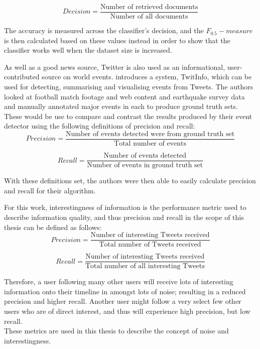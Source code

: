 \[
	Decision = \frac{\text{Number of retrieved documents}}{\text{Number of all documents}}
\]

The accuracy is measured across the classifier's decision, and the $ F_{0.5}-measure $  is then calculated based on these values instead in order to show that the classifier works well when the dataset size is increased.

As well as a good news source, Twitter is also used as an informational, user-contributed source on world events. \cite{marcus11}  introduces a system, TwitInfo, which can be used for detecting, summarising and visualising events from Tweets. The authors looked at football match footage and web content and earthquake survey data and manually annotated major events in each to produce ground truth sets. These would be use to compare and contrast the results produced by their event detector using the following definitions of precision and recall:
\[	
	Precision = \frac{\text{Number of events detected were from ground truth set}}{\text{Total number of events}}
\]

\[
	Recall = \frac{\text{Number of events detected}}{\text{Number of events in ground truth set}}
\]

With these definitions set, the authors were then able to easily calculate precision and recall for their algorithm.

For this work, interestingness of information is the performance metric used to describe information quality, and thus precision and recall in the scope of this thesis can be defined as follows:
\[
	Precision = \frac{\text{Number of interesting Tweets received}}{\text{Total number of Tweets received}}
\]

\[
	Recall = \frac{\text{Number of interesting Tweets received}}{\text{Total number of all interesting Tweets}}
\]

Therefore, a user following many other users will receive lots of interesting information onto their timeline in amongst lots of noise; resulting in a reduced precision and higher recall. Another user might follow a very select few other users who are of direct interest, and thus will experience high precision, but low recall.\\
These metrics are used in this thesis to describe the concept of noise and interestingness.


